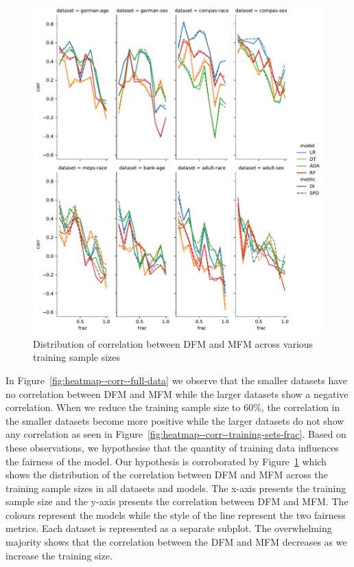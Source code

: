 \documentclass{article}
\begin{document}
\begin{figure}
  \centering
  \includegraphics[width=0.95\linewidth]{lineplot--frac--corr.pdf}
  \caption{Distribution of correlation between DFM and MFM across
    various training sample sizes}
  \label{fig:lineplot--frac--corr}
\end{figure}

In Figure \ref{fig:heatmap--corr--full-data} we observe that the
smaller datasets have no correlation between DFM and MFM while the
larger datasets show a negative correlation. When we reduce the
training sample size to 60\%, the correlation in the smaller datasets
become more positive while the larger datasets do not show any
correlation as seen in
Figure \ref{fig:heatmap--corr--training-sets-frac}. Based on these
observations, we hypothesise that the quantity of training data
influences the fairness of the model. Our hypothesis is corroborated
by Figure \ref{fig:lineplot--frac--corr} which shows the distribution
of the correlation between DFM and MFM across the training sample
sizes in all datasets and models. The x-axis presents the training
sample size and the y-axis presents the correlation between DFM and
MFM. The colours represent the models while the style of the line
represent the two fairness metrics. Each dataset is represented as
a separate subplot. The overwhelming majority shows that the
correlation between the DFM and MFM decreases as we increase the
training size.
\end{document}

